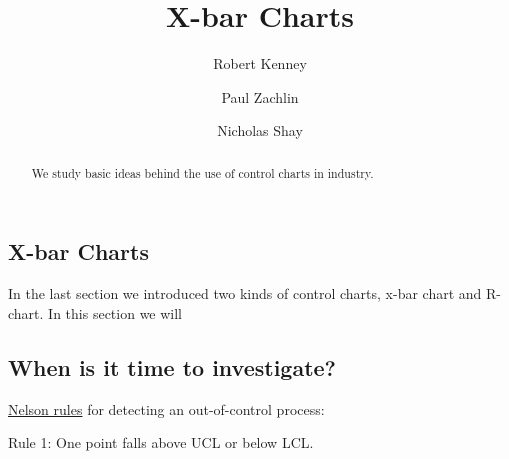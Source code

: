 \documentclass{ximera}
\author{Robert Kenney \and Paul Zachlin \and Nicholas Shay}
\title{X-bar Charts} \license{CC BY-NC-SA 4.0}
\begin{document}
\begin{abstract}
We study basic ideas behind the use of control charts in industry.
\end{abstract}
\maketitle

\begin{onlineOnly}
\section*{X-bar Charts}
\end{onlineOnly}

In the last section we introduced two kinds of control charts, x-bar chart and R-chart.  In this section we will 




\subsection*{When is it time to investigate?}

\href{https://www.qimacros.com/control-chart/stability-analysis-control-chart-rules/}{Nelson rules} for detecting an out-of-control process:

Rule 1:  One point falls above UCL or below LCL.
\end{document}
